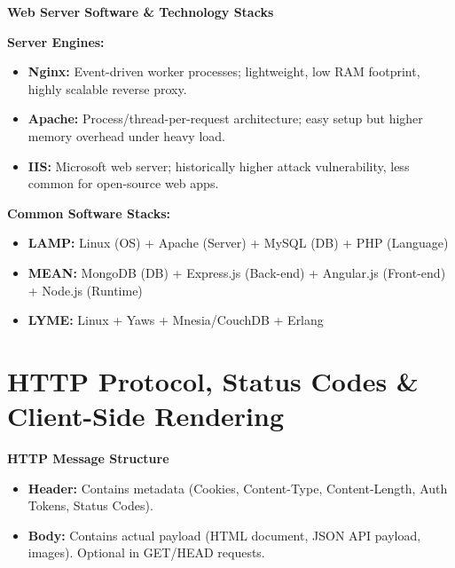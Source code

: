 \documentclass[8pt, a4paper]{article}
\begin{document}
\begin{conceptbox}
\textbf{Web Server Software \& Technology Stacks}

\medskip
\textbf{Server Engines:}
\begin{itemize}
  \item \textbf{Nginx:} Event-driven worker processes; lightweight, low RAM footprint, highly scalable reverse proxy.
  \item \textbf{Apache:} Process/thread-per-request architecture; easy setup but higher memory overhead under heavy load.
  \item \textbf{IIS:} Microsoft web server; historically higher attack vulnerability, less common for open-source web apps.
\end{itemize}

\textbf{Common Software Stacks:}
\begin{itemize}
  \item \textbf{LAMP:} Linux (OS) + Apache (Server) + MySQL (DB) + PHP (Language)
  \item \textbf{MEAN:} MongoDB (DB) + Express.js (Back-end) + Angular.js (Front-end) + Node.js (Runtime)
  \item \textbf{LYME:} Linux + Yaws + Mnesia/CouchDB + Erlang
\end{itemize}
\end{conceptbox}

\section{HTTP Protocol, Status Codes \& Client-Side Rendering}

\begin{conceptbox}
\textbf{HTTP Message Structure}
\begin{itemize}
  \item \textbf{Header:} Contains metadata (Cookies, Content-Type, Content-Length, Auth Tokens, Status Codes).
  \item \textbf{Body:} Contains actual payload (HTML document, JSON API payload, images). Optional in GET/HEAD requests.
\end{itemize}
\end{conceptbox}
\end{document}
